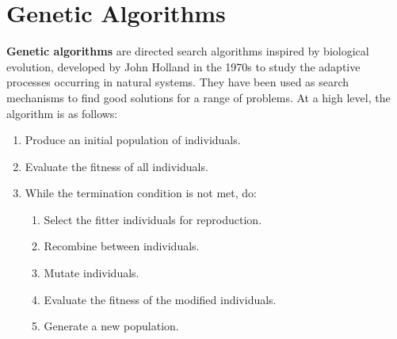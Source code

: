 \documentclass[a4paper,11pt]{article}
\begin{document}
\section{Genetic Algorithms}
\textbf{Genetic algorithms} are directed search algorithms inspired by biological evolution, developed by John Holland in the 1970s to study the adaptive processes occurring in natural systems.
They have been used as search mechanisms to find good solutions for a range of problems.
At a high level, the algorithm is as follows:
\begin{enumerate}
    \item   Produce an initial population of individuals.
    \item   Evaluate the fitness of all individuals.
    \item   While the termination condition is not met, do:
            \begin{enumerate}[label=\arabic*.]
                \item   Select the fitter individuals for reproduction.
                \item   Recombine between individuals.
                \item   Mutate individuals.
                \item   Evaluate the fitness of the modified individuals.
                \item   Generate a new population.
            \end{enumerate}
\end{enumerate}
\end{document}
